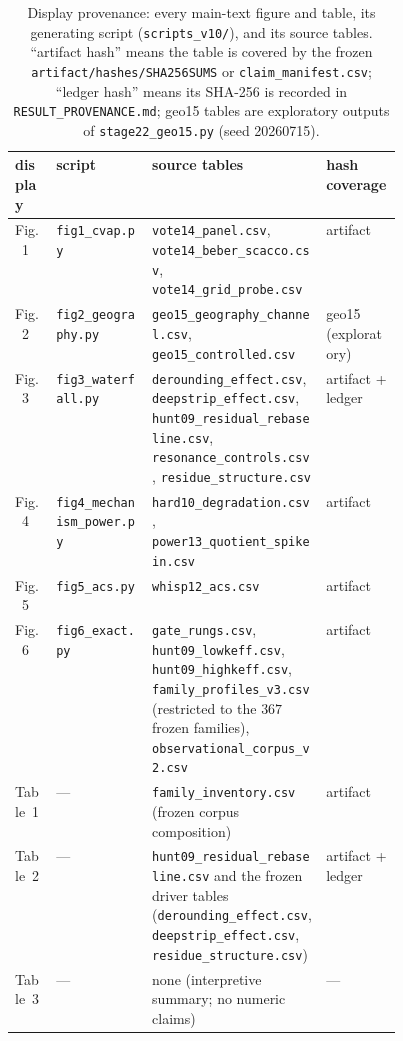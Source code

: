 \documentclass[12pt]{article}
\begin{document}
\begin{table}[t]
\centering
\caption{Display provenance: every main-text figure and table, its
generating script (\texttt{scripts\_v10/}), and its source tables. ``artifact
hash'' means the table is covered by the frozen
\texttt{artifact/hashes/SHA256SUMS} or \texttt{claim\_manifest.csv};
``ledger hash'' means its SHA-256 is recorded in
\texttt{RESULT\_PROVENANCE.md}; geo15 tables are exploratory outputs of
\texttt{stage22\_geo15.py} (seed 20260715).}
\label{tab:displayprov}
\scriptsize
\setlength{\tabcolsep}{4pt}
\begin{tabular}{llp{0.45\linewidth}l}
\toprule
display & script & source tables & hash coverage \\
\midrule
Fig.~1 & \texttt{fig1\_cvap.py} & \texttt{vote14\_panel.csv}, \texttt{vote14\_beber\_scacco.csv}, \texttt{vote14\_grid\_probe.csv} & artifact \\
Fig.~2 & \texttt{fig2\_geography.py} & \texttt{geo15\_geography\_channel.csv}, \texttt{geo15\_controlled.csv} & geo15 (exploratory) \\
Fig.~3 & \texttt{fig3\_waterfall.py} & \texttt{derounding\_effect.csv}, \texttt{deepstrip\_effect.csv}, \texttt{hunt09\_residual\_rebaseline.csv}, \texttt{resonance\_controls.csv}, \texttt{residue\_structure.csv} & artifact + ledger \\
Fig.~4 & \texttt{fig4\_mechanism\_power.py} & \texttt{hard10\_degradation.csv}, \texttt{power13\_quotient\_spikein.csv} & artifact \\
Fig.~5 & \texttt{fig5\_acs.py} & \texttt{whisp12\_acs.csv} & artifact \\
Fig.~6 & \texttt{fig6\_exact.py} & \texttt{gate\_rungs.csv}, \texttt{hunt09\_lowkeff.csv}, \texttt{hunt09\_highkeff.csv}, \texttt{family\_profiles\_v3.csv} (restricted to the $367$ frozen families), \texttt{observational\_corpus\_v2.csv} & artifact \\
Table~1 & --- & \texttt{family\_inventory.csv} (frozen corpus composition) & artifact \\
Table~2 & --- & \texttt{hunt09\_residual\_rebaseline.csv} and the frozen driver tables (\texttt{derounding\_effect.csv}, \texttt{deepstrip\_effect.csv}, \texttt{residue\_structure.csv}) & artifact + ledger \\
Table~3 & --- & none (interpretive summary; no numeric claims) & --- \\
\bottomrule
\end{tabular}
\end{table}
\end{document}
